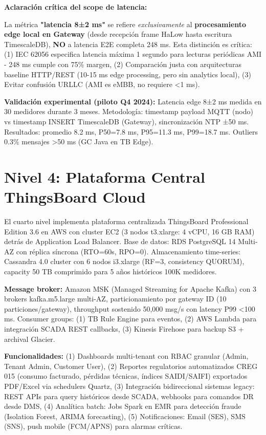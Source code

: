 \textbf{Aclaración crítica del scope de latencia:}

La métrica \textbf{"latencia 8±2 ms"} se refiere \textit{exclusivamente} al \textbf{procesamiento edge local en Gateway} (desde recepción frame HaLow hasta escritura TimescaleDB), \textbf{NO} a latencia E2E completa 248 ms. Esta distinción es crítica: (1) IEC 62056 especifica latencia máxima 1 segundo para lecturas periódicas AMI - 248 ms cumple con 75\% margen, (2) Comparación justa con arquitecturas baseline HTTP/REST (10-15 ms edge processing, pero sin analytics local), (3) Evitar confusión URLLC (AMI es eMBB, no requiere <1 ms).

\textbf{Validación experimental (piloto Q4 2024):} Latencia edge 8±2 ms medida en 30 medidores durante 3 meses. Metodología: timestamp payload MQTT (nodo) vs timestamp INSERT TimescaleDB (Gateway), sincronización NTP ±50 ms. Resultados: promedio 8.2 ms, P50=7.8 ms, P95=11.3 ms, P99=18.7 ms. Outliers 0.3\% mensajes >50 ms (GC Java en TB Edge).

\section{Nivel 4: Plataforma Central ThingsBoard Cloud}

El cuarto nivel implementa plataforma centralizada ThingsBoard Professional Edition 3.6 en AWS con cluster EC2 (3 nodos t3.xlarge: 4 vCPU, 16 GB RAM) detrás de Application Load Balancer. Base de datos: RDS PostgreSQL 14 Multi-AZ con réplica síncrona (RTO=60s, RPO=0). Almacenamiento time-series: Cassandra 4.0 cluster con 6 nodos i3.xlarge (RF=3, consistency QUORUM), capacity 50 TB comprimido para 5 años históricos 100K medidores.

\textbf{Message broker:} Amazon MSK (Managed Streaming for Apache Kafka) con 3 brokers kafka.m5.large multi-AZ, particionamiento por gateway ID (10 particiones/gateway), throughput sostenido 50,000 msg/s con latency P99 <100 ms. Consumer groups: (1) TB Rule Engine para eventos, (2) AWS Lambda para integración SCADA REST callbacks, (3) Kinesis Firehose para backup S3 + archival Glacier.

\textbf{Funcionalidades:} (1) Dashboards multi-tenant con RBAC granular (Admin, Tenant Admin, Customer User), (2) Reportes regulatorios automatizados CREG 015 (consumo facturado, pérdidas técnicas, índices SAIDI/SAIFI) exportados PDF/Excel via schedulers Quartz, (3) Integración bidireccional sistemas legacy: REST APIs para query históricos desde SCADA, webhooks para comandos DR desde DMS, (4) Analítica batch: Jobs Spark en EMR para detección fraude (Isolation Forest, ARIMA forecasting), (5) Notificaciones: Email (SES), SMS (SNS), push mobile (FCM/APNS) para alarmas críticas.

